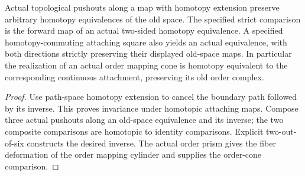 \begin{proposition}
  \label{prop:actual-cofibration-pushout-homotopy-equivalences}
  \leanok
  Actual topological pushouts along a map with homotopy extension preserve arbitrary homotopy equivalences of the old space. The specified strict comparison is the forward map of an actual two-sided homotopy equivalence. A specified homotopy-commuting attaching square also yields an actual equivalence, with both directions strictly preserving their displayed old-space maps. In particular the realization of an actual order mapping cone is homotopy equivalent to the corresponding continuous attachment, preserving its old order complex.
\end{proposition}
\begin{proof}
  Use path-space homotopy extension to cancel the boundary path followed by its inverse. This proves invariance under homotopic attaching maps. Compose three actual pushouts along an old-space equivalence and its inverse; the two composite comparisons are homotopic to identity comparisons. Explicit two-out-of-six constructs the desired inverse. The actual order prism gives the fiber deformation of the order mapping cylinder and supplies the order-cone comparison.
  \leanok
\end{proof}

